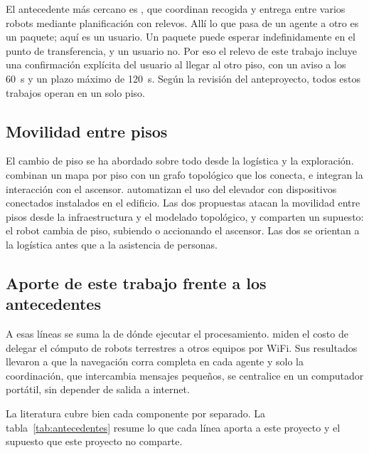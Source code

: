 El antecedente más cercano es \textcite{srivastava2025deliver}, que coordinan
recogida y entrega entre varios robots mediante planificación con relevos. Allí
lo que pasa de un agente a otro es un paquete; aquí es un usuario. Un paquete
puede esperar indefinidamente en el punto de transferencia, y un usuario no. Por
eso el relevo de este trabajo incluye una confirmación explícita del usuario al
llegar al otro piso, con un aviso a los 60~s y un plazo máximo de 120~s. Según la revisión del anteproyecto, todos estos trabajos operan en un solo
piso.

\subsection{Movilidad entre pisos}

El cambio de piso se ha abordado sobre todo desde la logística y la
exploración. \textcite{kim2024indoor} combinan un mapa por piso con un grafo
topológico que los conecta, e integran la interacción con el ascensor.
\textcite{song2024elevator} automatizan el uso del elevador con dispositivos
conectados instalados en el edificio. Las dos propuestas atacan la movilidad entre pisos desde la infraestructura y el modelado topológico, y comparten un supuesto: el robot
cambia de piso, subiendo o accionando el ascensor. Las dos se orientan a la logística antes que a la asistencia de personas.

\subsection{Aporte de este trabajo frente a los antecedentes}
\label{sec:aporte}

A esas líneas se suma la de dónde ejecutar el procesamiento. \textcite{malavolta2023offloading} miden el costo de delegar el cómputo de robots terrestres a otros equipos por WiFi. Sus resultados llevaron a que la navegación corra completa en cada agente y solo la coordinación, que intercambia mensajes pequeños,
se centralice en un computador portátil, sin depender de salida a internet.

La literatura cubre bien cada componente por separado. La
tabla~\ref{tab:antecedentes} resume lo que cada línea aporta a este proyecto y el
supuesto que este proyecto no comparte.

